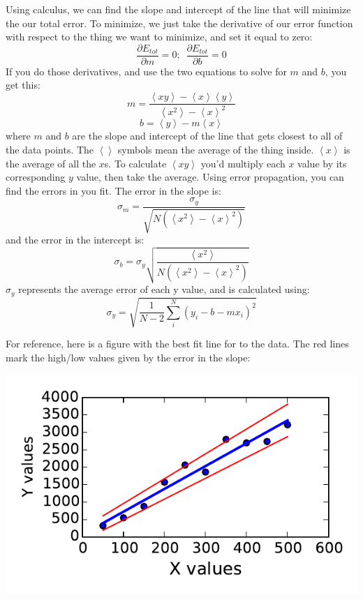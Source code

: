 \documentclass[twoside,11pt,ShortChapTitles]{BYUTextbook}
\begin{document}
Using calculus, we can find the slope and intercept of the line that will minimize the our total error.  To minimize, we just take the derivative of our error function with respect to the thing we want to minimize, and set it equal to zero:
\[\frac{\partial E_{tot}}{\partial m}=0;\,\,\,\frac{\partial E_{tot}}{\partial b}=0\]
If you do those derivatives, and use the two equations to solve for $m$ and $b$, you get this:
\[m=\frac{\left<xy\right>-\left<x\right>\left<y\right>}{\left<x^2\right>-\left<x\right>^2}\]
\[b=\left<y\right>-m\left<x\right>\]
where $m$ and $b$ are the slope and intercept of the line that gets closest to all of the data points.  The $\left<\right>$ symbols mean the average of the thing inside. $\left<x\right>$ is the average of all the $x$s.  To calculate $\left<xy\right>$ you'd multiply each $x$ value by its corresponding $y$ value, then take the average.
Using error propagation, you can find the errors in you fit.  The error in the slope is:
\[\sigma_m=\frac{\sigma_y}{\sqrt{N\left(\left<x^2\right>-\left<x\right>^2\right)}}\]
and the error in the intercept is:
\[\sigma_b=\sigma_y\sqrt{\frac{\left<x^2\right>}{N\left(\left<x^2\right>-\left<x\right>^2\right)}}\]
$\sigma_y$ represents the average error of each y value, and is calculated using:
\[\sigma_y=\sqrt{\frac{1}{N-2}\sum_i^N \left(y_i-b-mx_i\right)^2}\]

For reference, here is a figure with the best fit line for to the data.  The red lines mark the high/low values given by the error in the slope:
\begin{center}
\includegraphics{Lab4_figs/dataWfitRange.pdf}
\end{center}
\end{document}
